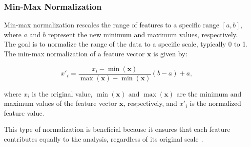 \subsubsection{Min-Max Normalization}\label{subsec:min-max}
Min-max normalization rescales the range of features to a specific range $[a, b]$, where $a$ and $b$ represent the new minimum and maximum values, respectively.
The goal is to normalize the range of the data to a specific scale, typically 0 to 1.
The min-max normalization of a feature vector $\mathbf{x}$ is given by:

$$
x'_i = \frac{x_i - \min(\mathbf{x})}{\max(\mathbf{x}) - \min(\mathbf{x})}(b - a) + a,
$$

where $x_i$ is the original value, $\min(\mathbf{x})$ and $\max(\mathbf{x})$ are the minimum and maximum values of the feature vector $\mathbf{x}$, respectively, and $x'_i$ is the normalized feature value.

This type of normalization is beneficial because it ensures that each feature contributes equally to the analysis, regardless of its original scale~\cite{dataminingConcepts}.